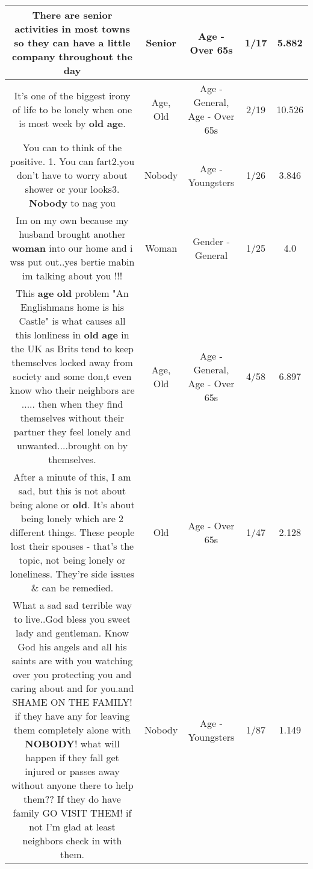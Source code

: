 \documentclass[11pt]{article}
\newlength\mylength
\begin{document}
\begin{center}
\begin{longtable}{|C{.65\mylength}|C{.30\mylength}|C{.12\mylength}|C{.12\mylength}|C{.12\mylength}|}
  \small There are \textbf{senior} activities in most towns so they can have a little company throughout the day\normalsize   & Senior & Age - Over 65s & 1/17 & 5.882 \\  \hline
  \small It's one of the biggest irony of life to be lonely when one is most week by \textbf{old} \textbf{age}.\normalsize   & Age, Old & Age - General, Age - Over 65s & 2/19 & 10.526 \\  \hline
  \small You can to think of the positive. 1. You can fart2.you don't have to worry about shower or your looks3. \textbf{Nobody} to nag you\normalsize   & Nobody & Age - Youngsters & 1/26 & 3.846 \\  \hline
  \small Im on my own because my husband brought another \textbf{woman} into our home and i wss put out..yes bertie mabin im talking about you !!!\normalsize   & Woman & Gender - General & 1/25 & 4.0 \\  \hline
  \small This \textbf{age} \textbf{old} problem "An Englishmans home is his Castle"  is what causes all this lonliness in \textbf{old} \textbf{age} in the UK as Brits tend to keep themselves locked away from society and some don,t even know who their neighbors are ..... then when they find themselves without their partner they feel lonely and unwanted....brought on by themselves.\normalsize   & Age, Old & Age - General, Age - Over 65s & 4/58 & 6.897 \\  \hline
  \small After a minute of this, I am sad, but this is not about being alone or \textbf{old}. It's about being lonely which are 2 different things. These people lost their spouses - that's the topic, not being lonely or loneliness. They're side issues \& can be remedied.\normalsize   & Old & Age - Over 65s & 1/47 & 2.128 \\  \hline
  \small What a sad sad terrible way to live..God bless you sweet lady and gentleman. Know God his angels and all his saints are with you watching over you protecting you and caring about and for you.and SHAME ON THE FAMILY! if they have any for leaving them completely alone with \textbf{NOBODY}! what will happen if they fall get injured or passes away without anyone there to help them?? If they do have family GO VISIT THEM! if not I'm glad at least neighbors check in with them.\normalsize   & Nobody & Age - Youngsters & 1/87 & 1.149 \\  \hline

\end{longtable}
\end{center}
\end{document}
